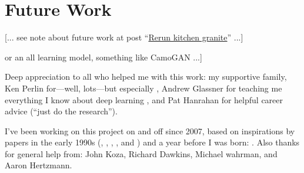 \documentclass[sigconf]{acmart}
\begin{document}

\section{Future Work}
[... see note about future work at post “\href{https://cwreynolds.github.io/TexSyn/#20221106}{Rerun kitchen granite}” ...]
\par
[... propose a crowd sourced user study of camouflage quality ... could be based on time to find ... like the interactive web games of \href{https://www.visual-ecology.com/2020/10/06/martin-stevens/}{Martin Stevens} nuthatch egg? ...] 
\par
[... currently a “mixed paradigm” model using both evolution and learning ... (maybe note these typically co-occur in nature  \cite{valiant_probably_2013}) ... propose an all-evolution model with evolved detectors for predators [... perhaps like the work of \href{https://people.wgtn.ac.nz/Mengjie.Zhang}{Mengjie Zhang} or his students like \href{https://yingbi92.github.io/homepage/}{Ying Bi}? find a representative paper to cite, perhaps coauthored by them ...] or an all learning model, something like CamoGAN \cite{talas_camogan_2020} ...]
\par



\begin{acks}
Deep appreciation to all who helped me with this work: my supportive family, Ken Perlin for—well, lots—but especially \cite{perlin_image_1985}, Andrew Glassner for teaching me everything I know about deep learning \cite{glassner_deep_2021}, and Pat Hanrahan for helpful career advice (“just do the research”).
\par
I've been working on this project on and off since 2007, based on inspirations by papers in the early 1990s (\citet{witkin_reaction_1991}, \citet{turk_generating_1991}, \citet{angeline_competitive_1993}, \citet{sims_artificial_1991}, and \citet{sims_evolving_1994}) and a year before I was born: \citet{turing_chemical_1952}.
Also thanks for general help from:
John Koza,
Richard Dawkins,
Michael wahrman, 
and
Aaron Hertzmann.


\end{acks}
\end{document}
